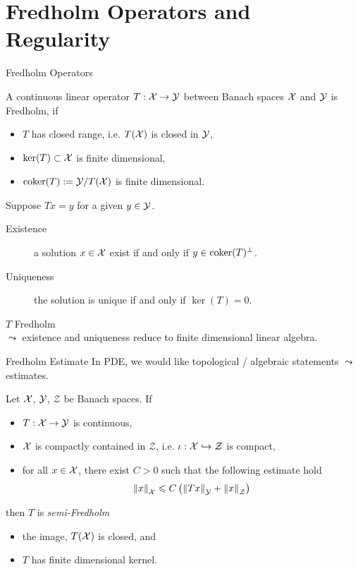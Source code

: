 \documentclass{beamer}
\begin{document}
\section{Fredholm Operators and Regularity} 


\begin{frame}{Fredholm Operators}
\begin{definition}
    A continuous linear operator $T : \X \to\Y$ between Banach spaces $\X$ and $\Y$ is Fredholm, if 
    \begin{itemize}
        \item $T$ has closed range, i.e. $T(\X)$ is closed in $\Y$, 
        \item $\ker(T) \subset \X $ is finite dimensional, 
        \item $\coker(T) := \Y / T(\X)$ is finite dimensional. 
    \end{itemize}
\end{definition}
\pause
Suppose $Tx = y$ for a given $y \in \Y$. 
\begin{description}
    \item[Existence] a solution $x \in \X$ exist if and only if  $y \in \coker(T)^\perp $. 
    \item[Uniqueness] the solution is unique if and only if $\ker(T) = 0$. 
\end{description}
\pause
$T$ Fredholm \\
$\leadsto$ existence and uniqueness reduce to finite dimensional linear algebra. 

\end{frame}

\begin{frame}{Fredholm Estimate}
In PDE, we would like  topological / algebraic statements $\leadsto$ estimates. 
\pause
\begin{theorem} \label{theorem: fredholm estimates}
    Let $\X$, $\Y$, $\mathcal{Z}$ be Banach spaces.  If 
    \begin{itemize}
        \item $T : \X \to \Y$ is continuous, 
        \item $\X$ is compactly contained in $\mathcal{Z}$, i.e.  $\iota : \X\hookrightarrow \mathcal{Z}$ is compact, 
        \item for all $x \in \X$, there exist $C > 0$ such that the  following estimate hold
        \begin{align}
        \norm[x]_\X \leq C \brac{\norm[Tx]_\Y + \norm[x]_\mathcal{Z}}
        \end{align}
    \end{itemize}
    then $T$ is \textit{semi-Fredholm}
    \begin{itemize}
        \item the image, $T(\X)$ is closed, and
        \item $T$ has finite dimensional kernel. 
    \end{itemize} 
\end{theorem}


\end{frame} 
\end{document}
